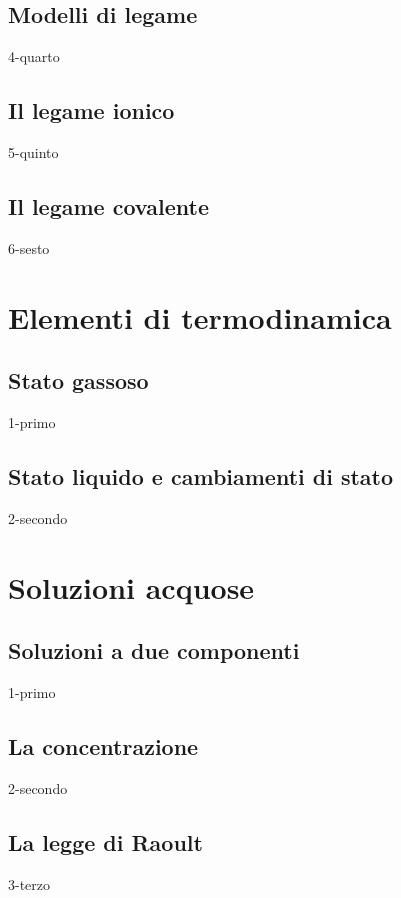 \documentclass[12pt]{book}%
\begin{document}
    \newpage

  \section{Modelli di legame}
    {4-quarto}

    \newpage

  \section{Il legame ionico}
    {5-quinto}

    \newpage

  \section{Il legame covalente}
    {6-sesto}

\chapter{Elementi di termodinamica}

  \section{Stato gassoso}
    {1-primo}

  \section{Stato liquido e cambiamenti di stato}
    {2-secondo}

\chapter{Soluzioni acquose}

  \section{Soluzioni a due componenti}
    {1-primo}

  \section{La concentrazione}
    {2-secondo}

  \section{La legge di Raoult}
    {3-terzo}
\end{document}
